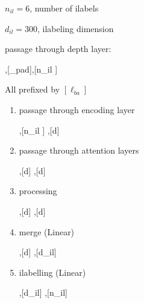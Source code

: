 \documentclass[12pt]{article}
\begin{document}
$n_{il}=6$, number of ilabels

$d_{il}=300$, ilabeling dimension

passage through depth layer:

 \beq
 [\ell_{ba}],[\ell_{pad}],[n_{il} ]
\rarrow {}
\eeq

All prefixed by $[\ell_{ba}]$
\begin{enumerate}
\item passage through encoding layer

 ,[n_{il} ]
,[d]
\eeq

\item passage through attention layers


,[d]
,[d]
\eeq

\item processing

,[d]
,[d]
\eeq


\item merge (Linear)

,[d]
,[d_{il}]
\eeq

\item ilabelling (Linear)

,[d_{il}]
,[n_{il}]
\eeq



\end{enumerate}
\end{document}
